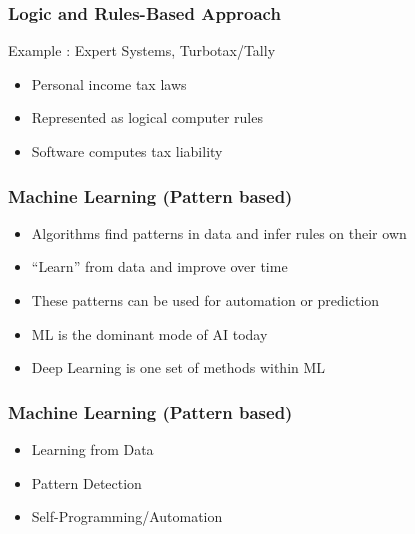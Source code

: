 \begin{frame}[fragile]\frametitle{Logic and Rules-Based Approach}
Example :  Expert Systems, Turbotax/Tally
\begin{itemize}
\item  Personal income tax laws 
\item  Represented as logical computer rules
\item  Software computes tax liability
\end{itemize}
\end{frame}

\begin{frame}[fragile]\frametitle{Machine Learning (Pattern based)}
\begin{itemize}
\item  Algorithms find patterns in data and infer rules on their own
\item   ``Learn'' from data and improve over time
\item  These patterns can be used for automation or prediction
\item  ML is the dominant mode of AI today
\item Deep Learning is one set of methods within ML
\end{itemize}
\end{frame}

\begin{frame}[fragile]\frametitle{Machine Learning (Pattern based)}
\begin{itemize}
\item Learning from Data
\item Pattern Detection
\item Self-Programming/Automation
\end{itemize}
\end{frame}

